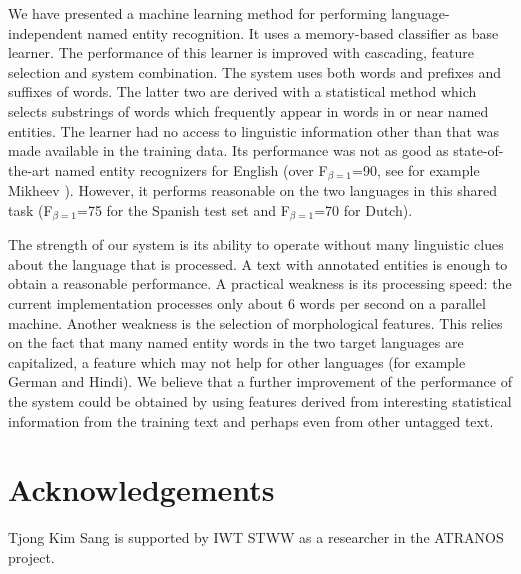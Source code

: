 \documentclass[10pt]{article}
\begin{document}
We have presented a machine learning method for performing 
language-independent named entity recognition.
It uses a memory-based classifier as base learner.
The performance of this learner is improved with cascading, feature
selection and system combination.
The system uses both words and prefixes and suffixes of words.
The latter two are derived with a statistical method which selects
substrings of words which frequently appear in words in or near
named entities.
The learner had no access to linguistic information other than that
was made available in the training data.
Its performance was not as good as state-of-the-art named entity
recognizers for English (over F$_{\beta=1}$=90, see for example
Mikheev ).
However, it performs reasonable on the two languages in this shared
task (F$_{\beta=1}$=75 for the Spanish test set and F$_{\beta=1}$=70
for Dutch).

The strength of our system is its ability to operate without many
linguistic clues about the language that is processed.
A text with annotated entities is enough to obtain a reasonable
performance.
A practical weakness is its processing speed: the current
implementation processes only about 6 words per second on a parallel
machine. 
Another weakness is the selection of morphological features.
This relies on the fact that many named entity words in the two target
languages are capitalized, a feature which may not help for other
languages (for example German and Hindi).
We believe that a further improvement of the performance of the system
could be obtained by using features derived from interesting statistical
information from the training text and perhaps even from other 
untagged text.


\section*{Acknowledgements}

Tjong Kim Sang is supported by IWT STWW as a researcher in the ATRANOS 
project.
\end{document}
